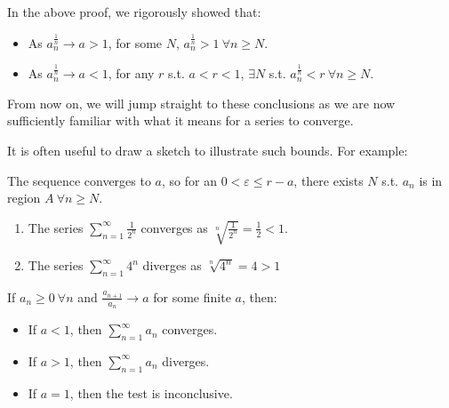 \documentclass[../main.tex]{subfiles}
\begin{document}
\begin{remark}
  In the above proof, we rigorously showed that:
  \begin{itemize}
    \item As $a^{\frac{1}{n}}_{n} \to a > 1$, for some $N$, $a^{\frac{1}{n}}_{n} > 1\ \forall n \geq N$.
    \item As $a^{\frac{1}{n}}_n \to a < 1$, for any $r$ s.t. $a < r < 1$, $\exists N$ s.t. $a^{\frac{1}{n}}_n < r\ \forall n \geq N$.
  \end{itemize}
  From now on, we will jump straight to these conclusions as we are now sufficiently familiar with what it means for a series to converge.

  It is often useful to draw a sketch to illustrate such bounds.
  For example:
  \begin{center}
  \end{center}
  The sequence converges to $a$, so for an $0 < \varepsilon \leq r - a$, there exists $N$ s.t. $a_n$ is in region $A\ \forall n \geq N$.
\end{remark}
\begin{example}
  \begin{enumerate}
    \item The series $\sum_{n = 1}^{\infty} \frac{1}{2^{n}}$ converges as $\sqrt[n]{\frac{1}{2^{n}}} = \frac{1}{2} < 1$.
    \item The series $\sum_{n = 1}^{\infty} 4^{n}$ diverges as $\sqrt[n]{4^{n}} = 4 > 1$
  \end{enumerate}
\end{example}
\begin{proposition}
  If $a_n \geq 0\ \forall n$ and $\frac{a_{n + 1}}{a_n} \to a$ for some finite $a$, then:
  \label{ratioTest}
  \begin{itemize}
    \item If $a < 1$, then $\sum_{n = 1}^{\infty} a_n$ converges.
    \item If $a > 1$, then $\sum_{n = 1}^{\infty} a_n$ diverges.
    \item If $a = 1$, then the test is inconclusive.
  \end{itemize}
\end{proposition}
\end{document}
